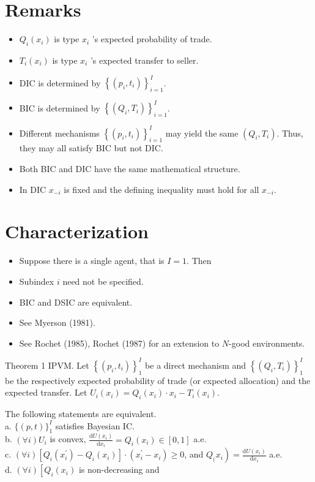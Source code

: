 \documentclass[10pt]{article}
\begin{document}
\section*{Remarks}
\begin{itemize}
  \item $Q_{i}\left(x_{i}\right)$ is type $x_{i}$ 's expected probability of trade.
  \item $T_{i}\left(x_{i}\right)$ is type $x_{i}$ 's expected transfer to seller.
  \item DIC is determined by $\left\{\left(p_{i}, t_{i}\right)\right\}_{i=1}^{I}$.
  \item BIC is determined by $\left\{\left(Q_{i}, T_{i}\right)\right\}_{i=1}^{I}$.
  \item Different mechanisms $\left\{\left(p_{i}, t_{i}\right)\right\}_{i=1}^{I}$ may yield the same $\left(Q_{i}, T_{i}\right)$. Thus, they may all satisfy BIC but not DIC.
  \item Both BIC and DIC have the same mathematical structure.
  \item In DIC $x_{-i}$ is fixed and the defining inequality must hold for all $x_{-i}$.
\end{itemize}

\section*{Characterization}
\begin{itemize}
  \item Suppose there is a single agent, that is $I=1$. Then
  \item Subindex $i$ need not be specified.
  \item BIC and DSIC are equivalent.
  \item See Myerson (1981).
  \item See Rochet (1985), Rochet (1987) for an extension to $N$-good environments.
\end{itemize}

Theorem 1 IPVM. Let $\left\{\left(p_{i}, t_{i}\right)\right\}_{1}^{I}$ be a direct mechanism and $\left\{\left(Q_{i}, T_{i}\right)\right\}_{1}^{I}$ be the respectively expected probability of trade (or expected allocation) and the expected transfer. Let $U_{i}\left(x_{i}\right)=Q_{i}\left(x_{i}\right) \cdot x_{i}-T_{i}\left(x_{i}\right)$.

The following statements are equivalent.\\
a. $\{(p, t)\}_{1}^{I}$ satisfies Bayesian IC.\\
b. $(\forall i) U_{i}$ is convex, $\frac{\mathrm{d} U\left(x_{i}\right)}{\mathrm{d} x_{i}}=Q_{i}\left(x_{i}\right) \in[0,1]$ a.e.\\
c. $(\forall i)\left[Q_{i}\left(x_{i}^{\prime}\right)-Q_{i}\left(x_{i}\right)\right] \cdot\left(x_{i}^{\prime}-x_{i}\right) \geq 0$, and $\left.Q_{( } x_{i}\right)=\frac{\mathrm{d} U\left(x_{i}\right)}{\mathrm{d} x_{i}}$ a.e.\\
d. $(\forall i)\left[Q_{i}\left(x_{i}\right)\right.$ is non-decreasing and
\end{document}
